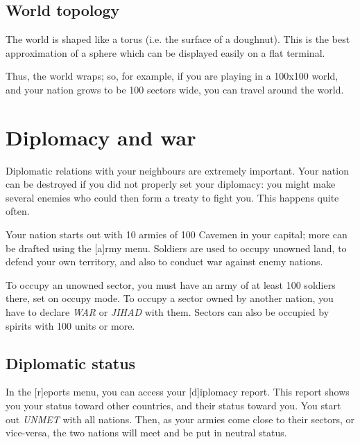 \section{World topology}
The world is shaped like a torus (i.e. the surface of a doughnut).
This is the best approximation of a sphere which can be displayed
easily on a flat terminal.

Thus, the world wraps; so, for example, if you are playing
in a 100x100 world, and your nation grows to be 100 sectors 
wide, you can travel around the world.


\chapter{Diplomacy and war}

Diplomatic relations with your neighbours are extremely important.
Your nation can be destroyed if you did not properly set your
diplomacy: you might make several enemies who could then form a treaty
to fight you.  This happens quite often.

Your nation starts out with 10 armies of 100 Cavemen in your capital;
more can be drafted using the [a]rmy menu.  Soldiers are used to
occupy unowned land, to defend your own territory, and also to conduct
war against enemy nations.

To occupy an unowned sector, you must have an army of at least 100
soldiers there, set on occupy mode.  To occupy a sector owned by
another nation, you have to declare \emph{WAR} or \emph{JIHAD} with
them.  Sectors can also be occupied by spirits with 100 units or more.

\section{Diplomatic status}
In the [r]eports menu, you can access your [d]iplomacy report.  This
report shows you your status toward other countries, and their status
toward you.  You start out \emph{UNMET} with all nations.  Then, as
your armies come close to their sectors, or vice-versa, the two
nations will meet and be put in neutral status.

